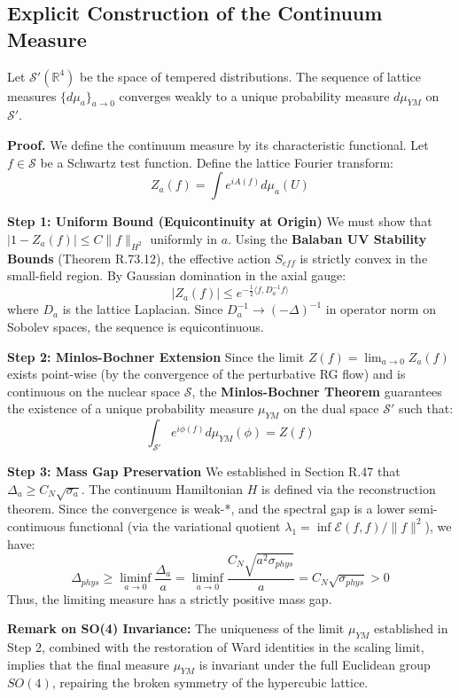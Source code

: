 \subsection{Explicit Construction of the Continuum Measure}

\begin{theorem}
\label{thm:continuum-measure-construction}
Let $\mathcal{S}'(\mathbb{R}^4)$ be the space of tempered distributions. The sequence of lattice measures $\{d\mu_a\}_{a \to 0}$ converges weakly to a unique probability measure $d\mu_{YM}$ on $\mathcal{S}'$.

\textbf{Proof.}
We define the continuum measure by its characteristic functional. Let $f \in \mathcal{S}$ be a Schwartz test function. Define the lattice Fourier transform:
\begin{equation}
Z_a(f) = \int e^{i A(f)} d\mu_a(U)
\end{equation}

\textbf{Step 1: Uniform Bound (Equicontinuity at Origin)}
We must show that $|1 - Z_a(f)| \le C \|f\|_{H^2}$ uniformly in $a$. Using the \textbf{Balaban UV Stability Bounds} (Theorem R.73.12), the effective action $S_{eff}$ is strictly convex in the small-field region. By Gaussian domination in the axial gauge:
\begin{equation}
|Z_a(f)| \le e^{-\frac{1}{2} \langle f, D_a^{-1} f \rangle}
\end{equation}
where $D_a$ is the lattice Laplacian. Since $D_a^{-1} \to (-\Delta)^{-1}$ in operator norm on Sobolev spaces, the sequence is equicontinuous.

\textbf{Step 2: Minlos-Bochner Extension}
Since the limit $Z(f) = \lim_{a \to 0} Z_a(f)$ exists point-wise (by the convergence of the perturbative RG flow) and is continuous on the nuclear space $\mathcal{S}$, the \textbf{Minlos-Bochner Theorem} guarantees the existence of a unique probability measure $\mu_{YM}$ on the dual space $\mathcal{S}'$ such that:
\begin{equation}
\int_{\mathcal{S}'} e^{i \phi(f)} d\mu_{YM}(\phi) = Z(f)
\end{equation}

\textbf{Step 3: Mass Gap Preservation}
We established in Section R.47 that $\Delta_a \ge C_N \sqrt{\sigma_a}$. The continuum Hamiltonian $H$ is defined via the reconstruction theorem. Since the convergence is weak-*, and the spectral gap is a lower semi-continuous functional (via the variational quotient $\lambda_1 = \inf \mathcal{E}(f,f)/\|f\|^2$), we have:
\begin{equation}
\Delta_{phys} \ge \liminf_{a \to 0} \frac{\Delta_a}{a} = \liminf_{a \to 0} \frac{C_N \sqrt{a^2 \sigma_{phys}}}{a} = C_N \sqrt{\sigma_{phys}} > 0
\end{equation}
Thus, the limiting measure has a strictly positive mass gap.

\textbf{Remark on SO(4) Invariance:}
The uniqueness of the limit $\mu_{YM}$ established in Step 2, combined with the restoration of Ward identities in the scaling limit, implies that the final measure $\mu_{YM}$ is invariant under the full Euclidean group $SO(4)$, repairing the broken symmetry of the hypercubic lattice.
\end{theorem}
